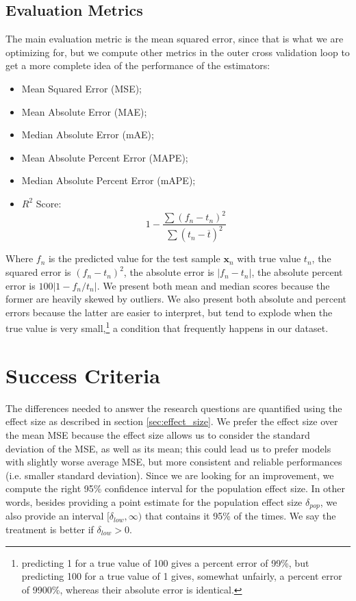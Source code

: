 \documentclass[a4paper]{book}
\begin{document}
\subsection{Evaluation Metrics}
The main evaluation metric is the mean squared error, since that is what we are optimizing for, but we compute other metrics in the outer cross validation loop to get a more complete idea of the performance of the estimators:

\begin{itemize}
\item Mean Squared Error (MSE);
\item Mean Absolute Error (MAE);
\item Median Absolute Error (mAE);
\item Mean Absolute Percent Error (MAPE);
\item Median Absolute Percent Error (mAPE);
\item $R^2$ Score:
$$
1-\frac{\sum (f_n-t_n)^2}{\sum (t_n-\overline{t})^2}
$$
\end{itemize}

Where $f_n$ is the predicted value for the test sample $\bm x_n$ with true value $t_n$, the squared error is $(f_n-t_n)^2$, the absolute error is $\vert f_n-t_n\vert$, the absolute percent error is $100\vert 1-f_n/t_n\vert$. We present both mean and median scores because the former are heavily skewed by outliers. We also present both absolute and percent errors because the latter are easier to interpret, but tend to explode when the true value is very small,\footnote{predicting 1 for a true value of 100 gives a percent error of 99\%, but predicting 100 for a true value of 1 gives, somewhat unfairly, a percent error of 9900\%, whereas their absolute error is identical.} a condition that frequently happens in our dataset.


\section{Success Criteria}
\label{sec:success}
The differences needed to answer the research questions are quantified using the effect size as described in section \ref{sec:effect_size}. We prefer the effect size over the mean MSE because the effect size allows us to consider the standard deviation of the MSE, as well as its mean; this could lead us to prefer models with slightly worse average MSE, but more consistent and reliable performances (i.e. smaller standard deviation). Since we are looking for an improvement, we compute the right 95\% confidence interval for the population effect size. In other words, besides providing a point estimate for the population effect size $\delta_{pop}$, we also provide an interval $[\delta_{low}, \infty)$ that contains it 95\% of the times. We say the treatment is better if $\delta_{low}>0$.
\end{document}
